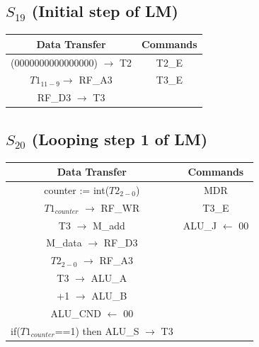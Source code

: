 \documentclass[]{report}
\begin{document}
            \subsection*{$S_{19}$ (Initial step of LM)} %
            \begin{center}
                \begin{tabular}{|c|c|}
                    \hline
                    Data Transfer & Commands \\
                    \hline
                    (0000000000000000) $\to$ T2 & T2\_E\\
                    $T1_{11-9} \to$ RF\_A3 & T3\_E\\
                    RF\_D3 $\to$ T3 & \\     %
                    \hline
                \end{tabular}
            \end{center}    

            \subsection*{$S_{20}$ (Looping step 1 of LM)} %
            \begin{center}
                \begin{tabular}{|c|c|}
                    \hline
                    Data Transfer & Commands \\
                    \hline
                    counter := int($T2_{2-0}$) & MDR\\
                    $T1_{counter}$ $\to$ RF\_WR & T3\_E\\
                    T3 $\to$ M\_add & ALU\_J $\leftarrow$ 00\\
                    M\_data $\to$ RF\_D3 & \\
                    $T2_{2-0}$ $\to$ RF\_A3 & \\
                    T3 $\to$ ALU\_A &\\
                    +1 $\to$ ALU\_B &\\
                    ALU\_CND $\leftarrow$ 00 & \\
                    if($T1_{counter}$==1) then ALU\_S $\to$ T3& \\
                    \hline
                \end{tabular}
            \end{center} 
\end{document}
